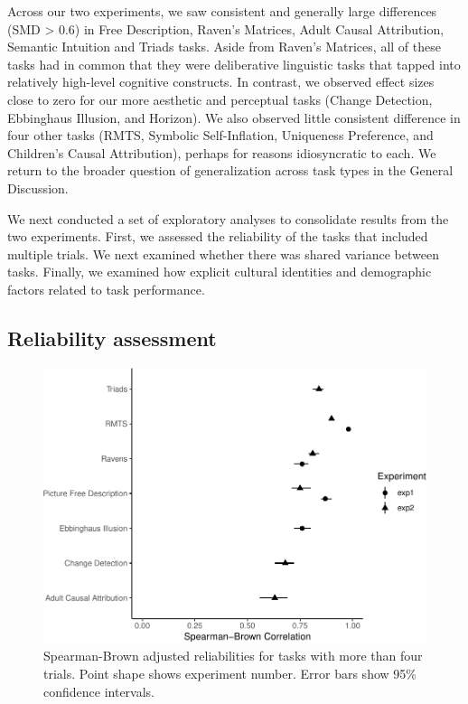 \documentclass[
  man,floatsintext]{apa6}
\begin{document}
Across our two experiments, we saw consistent and generally large differences (SMD \textgreater{} 0.6) in Free Description, Raven's Matrices, Adult Causal Attribution, Semantic Intuition and Triads tasks. Aside from Raven's Matrices, all of these tasks had in common that they were deliberative linguistic tasks that tapped into relatively high-level cognitive constructs. In contrast, we observed effect sizes close to zero for our more aesthetic and perceptual tasks (Change Detection, Ebbinghaus Illusion, and Horizon). We also observed little consistent difference in four other tasks (RMTS, Symbolic Self-Inflation, Uniqueness Preference, and Children's Causal Attribution), perhaps for reasons idiosyncratic to each. We return to the broader question of generalization across task types in the General Discussion.

We next conducted a set of exploratory analyses to consolidate results from the two experiments. First, we assessed the reliability of the tasks that included multiple trials. We next examined whether there was shared variance between tasks. Finally, we examined how explicit cultural identities and demographic factors related to task performance.

\hypertarget{reliability-assessment}{%
\subsection{Reliability assessment}\label{reliability-assessment}}

\begin{figure}
\centering
\includegraphics{CCRR_manuscript_files/figure-latex/reliability-1.pdf}
\caption{\label{fig:reliability}Spearman-Brown adjusted reliabilities for tasks with more than four trials. Point shape shows experiment number. Error bars show 95\% confidence intervals.}
\end{figure}
\end{document}
